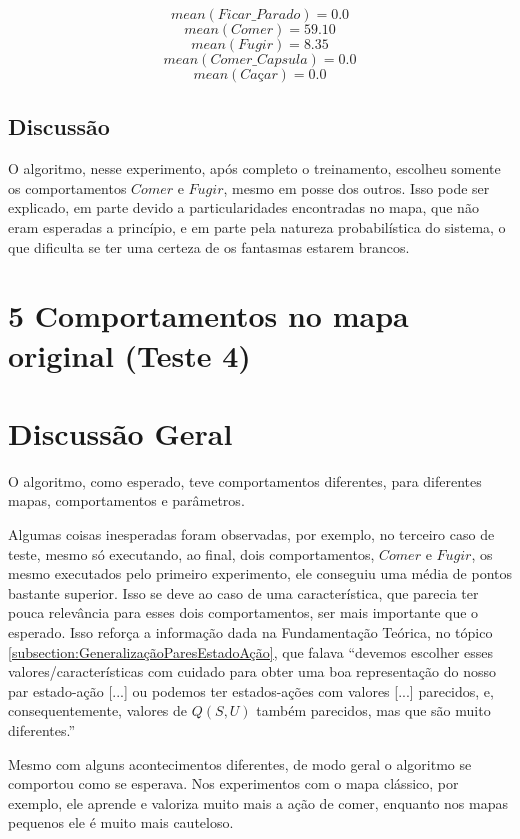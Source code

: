 $$ mean \left( Ficar\_Parado \right) = 0.0 $$
$$ mean \left( Comer \right) = 59.10 $$
$$ mean \left( Fugir \right) = 8.35 $$
$$ mean \left( Comer\_Capsula \right) = 0.0 $$
$$ mean \left( \textit{Caçar} \right) = 0.0 $$


\subsection{Discussão}

O algoritmo, nesse experimento, após completo o treinamento, escolheu somente os comportamentos $ Comer $ e $ Fugir $, mesmo em posse dos outros. Isso pode ser explicado, em parte devido a particularidades encontradas no mapa, que não eram esperadas a princípio, e em parte pela natureza probabilística do sistema, o que dificulta se ter uma certeza de os fantasmas estarem brancos.


\section{5 Comportamentos no mapa original (Teste 4)}


\section{Discussão Geral}

O algoritmo, como esperado, teve comportamentos diferentes, para diferentes mapas, comportamentos e parâmetros.

Algumas coisas inesperadas foram observadas, por exemplo, no terceiro caso de teste, mesmo só executando, ao final, dois comportamentos, $ Comer $ e $ Fugir $, os mesmo executados pelo primeiro experimento, ele conseguiu uma média de pontos bastante superior. Isso se deve ao caso de uma característica, que parecia ter pouca relevância para esses dois comportamentos, ser mais importante que o esperado. Isso reforça a informação dada na Fundamentação Teórica, no tópico \ref{subsection:GeneralizaçãoParesEstadoAção}, que falava ``devemos escolher esses valores/características com cuidado para obter uma boa representação do nosso par estado-ação [...] ou podemos ter estados-ações com valores [...] parecidos, e, consequentemente, valores de $ Q \left( S, U \right) $ também parecidos, mas que são muito diferentes.''

Mesmo com alguns acontecimentos diferentes, de modo geral o algoritmo se comportou como se esperava. Nos experimentos com o mapa clássico, por exemplo, ele aprende e valoriza muito mais a ação de comer, enquanto nos mapas pequenos ele é muito mais cauteloso.

